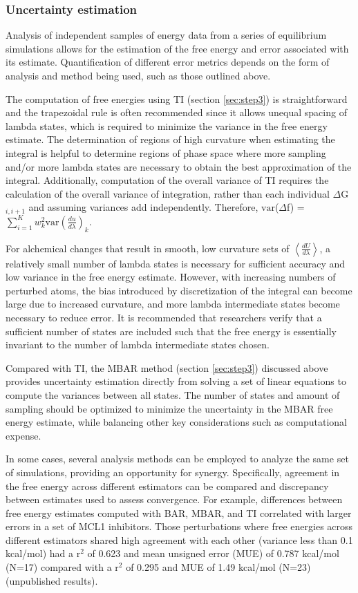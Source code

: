 \documentclass[9pt,bestpractices]{livecoms}
\newcommand{\expect}[1]{\left\langle{#1}\right\rangle}
\begin{document}
\subsubsection{Uncertainty estimation}
Analysis of independent samples of energy data from a series of equilibrium simulations allows for the estimation of the free energy and error associated with its estimate. 
Quantification of different error metrics depends on the form of analysis and method being used, such as those outlined above.

The computation of free energies using TI (section \ref{sec:step3}) is straightforward and the trapezoidal rule is often recommended since it allows unequal spacing of lambda states, which is required to minimize the variance in the free energy estimate. 
The determination of regions of high curvature when estimating the integral is helpful to determine regions of phase space where more sampling and/or more lambda states are necessary to obtain the best approximation of the integral.
Additionally, computation of the overall variance of TI requires the calculation of the overall variance of integration, rather than each individual $\Delta$G$_{i,i+1}$ and assuming variances add independently. 
Therefore, $\mathrm{var}$($\Delta$f) = $\sum_{i=1}^{K}w_{k}^2 \mathrm{var}(\frac{du}{d\lambda})_{k}$.

For alchemical changes that result in smooth, low curvature sets of $\expect{\frac{dU}{d\lambda}}$, a relatively small number of lambda states is necessary for sufficient accuracy and low variance in the free energy estimate. 
However, with increasing numbers of perturbed atoms, the bias introduced by discretization of the integral can become large due to increased curvature, and more lambda intermediate states become necessary to reduce error. 
It is recommended that researchers verify that a sufficient number of states are included such that the free energy is essentially invariant to the number of lambda intermediate states chosen.


Compared with TI, the MBAR method (section \ref{sec:step3}) discussed above provides uncertainty estimation directly from solving a set of linear equations to compute the variances between all states. 
The number of states and amount of sampling should be optimized to minimize the uncertainty in the MBAR free energy estimate, while balancing other key considerations such as computational expense. 

In some cases, several analysis methods can be employed to analyze the same set of simulations, providing an opportunity for synergy. Specifically, agreement in the free energy across different estimators can be compared and discrepancy between estimates used to assess convergence.
For example, differences between free energy estimates computed with BAR, MBAR, and TI correlated with larger errors in a set of MCL1 inhibitors.
Those perturbations where free energies across different estimators shared high agreement with each other (variance less than 0.1 kcal/mol) had a r$^2$ of 0.623 and mean unsigned error (MUE) of 0.787 kcal/mol (N=17) compared with a r$^2$ of 0.295 and MUE of 1.49 kcal/mol (N=23) (unpublished results).
\end{document}
